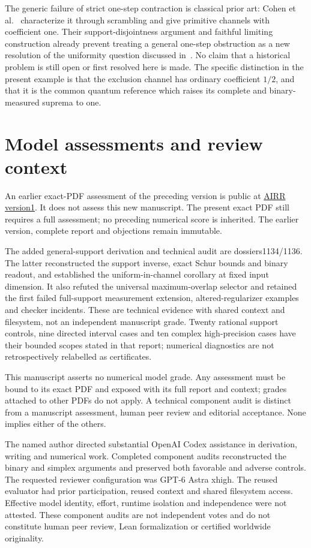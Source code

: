 \documentclass[11pt]{article}
\theoremstyle{remark}\newtheorem{remark}[theorem]{Remark}
\begin{document}
The generic failure of strict one-step contraction is classical prior art: Cohen et al.~\cite[Theorem 4.2 and Remark 4.3]{Cohen} characterize it through scrambling and give primitive channels with coefficient one. Their support-disjointness argument and faithful limiting construction already prevent treating a general one-step obstruction as a new resolution of the uniformity question discussed in~\cite{GR}. No claim that a historical problem is still open or first resolved here is made. The specific distinction in the present example is that the exclusion channel has ordinary coefficient $1/2$, and that it is the common quantum reference which raises its complete and binary-measured suprema to one.

\clearpage
\appendix
\section{Model assessments and review context}
An earlier exact-PDF assessment of the preceding version is public at \href{https://airr.science/papers/ARR-2026-564FZ70CSN83KACD/versions/v1/}{AIRR version1}. It does not assess this new manuscript. The present exact PDF still requires a full assessment; no preceding numerical score is inherited. The earlier version, complete report and objections remain immutable.

The added general-support derivation and technical audit are dossiers1134/1136. The latter reconstructed the support inverse, exact Schur bounds and binary readout, and established the uniform-in-channel corollary at fixed input dimension. It also refuted the universal maximum-overlap selector and retained the first failed full-support measurement extension, altered-regularizer examples and checker incidents. These are technical evidence with shared context and filesystem, not an independent manuscript grade. Twenty rational support controls, nine directed interval cases and ten complex high-precision cases have their bounded scopes stated in that report; numerical diagnostics are not retrospectively relabelled as certificates.


This manuscript asserts no numerical model grade. Any assessment must be bound to its exact PDF and exposed with its full report and context; grades attached to other PDFs do not apply. A technical component audit is distinct from a manuscript assessment, human peer review and editorial acceptance. None implies either of the others.

The named author directed substantial OpenAI Codex assistance in derivation, writing and numerical work. Completed component audits reconstructed the binary and simplex arguments and preserved both favorable and adverse controls. The requested reviewer configuration was GPT-6 Astra xhigh. The reused evaluator had prior participation, reused context and shared filesystem access. Effective model identity, effort, runtime isolation and independence were not attested. These component audits are not independent votes and do not constitute human peer review, Lean formalization or certified worldwide originality.
\end{document}
